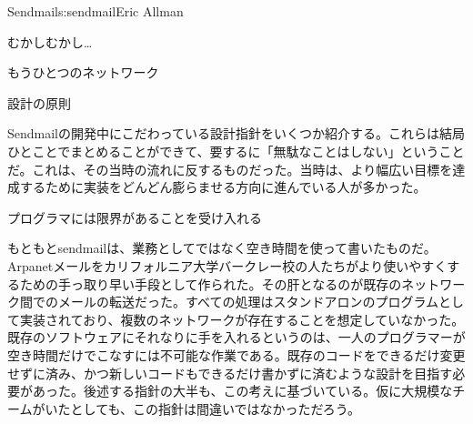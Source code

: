 \begin{aosachapter}{Sendmail}{s:sendmail}{Eric Allman}
\begin{aosasect1}{むかしむかし\ldots}
\begin{aosabox}{もうひとつのネットワーク}
\end{aosabox}

\end{aosasect1}

\begin{aosasect1}{設計の原則}

Sendmailの開発中にこだわっている設計指針をいくつか紹介する。これらは結局ひとことでまとめることができて、要するに「無駄なことはしない」ということだ。これは、その当時の流れに反するものだった。当時は、より幅広い目標を達成するために実装をどんどん膨らませる方向に進んでいる人が多かった。

\begin{aosasect2}{プログラマには限界があることを受け入れる}

もともとsendmailは、業務としてではなく空き時間を使って書いたものだ。Arpanetメールをカリフォルニア大学バークレー校の人たちがより使いやすくするための手っ取り早い手段として作られた。その肝となるのが既存のネットワーク間でのメールの転送だった。すべての処理はスタンドアロンのプログラムとして実装されており、複数のネットワークが存在することを想定していなかった。既存のソフトウェアにそれなりに手を入れるというのは、一人のプログラマーが空き時間だけでこなすには不可能な作業である。既存のコードをできるだけ変更せずに済み、かつ新しいコードもできるだけ書かずに済むような設計を目指す必要があった。後述する指針の大半も、この考えに基づいている。仮に大規模なチームがいたとしても、この指針は間違いではなかっただろう。


\end{aosasect2}
\end{aosasect1}
\end{aosachapter}
